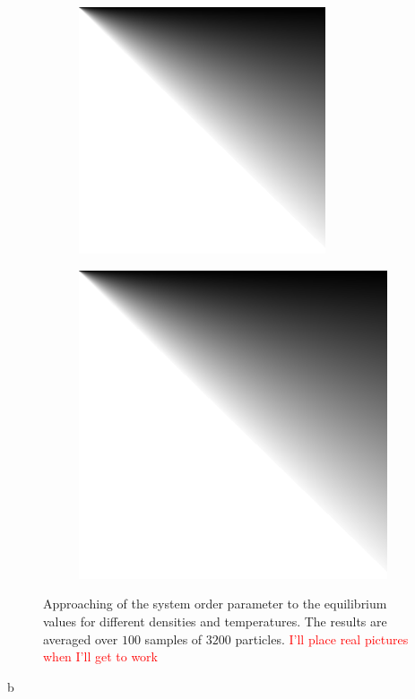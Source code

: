 \documentclass[12pt, a4paper]{article}
\begin{document}
\begin{figure}
 \centering
 \begin{subfigure}{.45\textwidth}
  \centering
  \includegraphics[width=0.8\textwidth]{Images/dummy.png}
 \end{subfigure}
 \begin{subfigure}{.45\textwidth}
  \centering
  \includegraphics[width=.8\textwidth]{Images/dummy.png}
 \end{subfigure}
 \captionsetup{justification=centering, width=0.9\columnwidth}
 \caption{Approaching of the system order parameter to the equilibrium values for different densities and temperatures. The results are averaged over $100$ samples of $3200$ particles.  \textcolor{red}{I'll place real pictures when I'll get to work}}
 \label{fig:equilibrium_orientation_prob}
\end{figure}b
\end{document}
